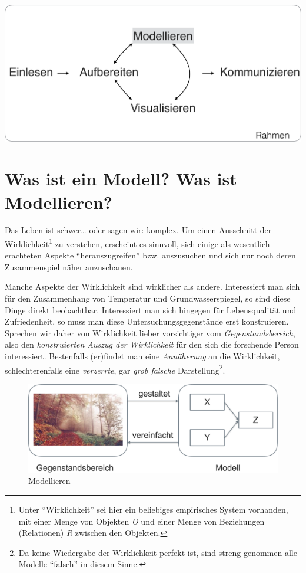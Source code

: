 \documentclass[12pt,]{book}
\let\rmarkdownfootnote\footnote%
\def\footnote{\protect\rmarkdownfootnote}
\begin{document}
\begin{center}\includegraphics[width=0.7\linewidth]{images/Modellieren} \end{center}

\section{Was ist ein Modell? Was ist Modellieren?}\label{Modellieren}

Das Leben ist schwer\ldots{} oder sagen wir: komplex. Um einen
Ausschnitt der Wirklichkeit\footnote{Unter ``Wirklichkeit'' sei hier ein
  beliebiges empirisches System vorhanden, mit einer Menge von Objekten
  \emph{O} und einer Menge von Beziehungen (Relationen) \emph{R}
  zwischen den Objekten.} zu verstehen, erscheint es sinnvoll, sich
einige als wesentlich erachteten Aspekte ``herauszugreifen'' bzw.
auszusuchen und sich nur noch deren Zusammenspiel näher anzuschauen.

Manche Aspekte der Wirklichkeit sind wirklicher als andere. Interessiert
man sich für den Zusammenhang von Temperatur und Grundwasserspiegel, so
sind diese Dinge direkt beobachtbar. Interessiert man sich hingegen für
Lebensqualität und Zufriedenheit, so muss man diese
Untersuchungsgegenstände erst konstruieren. Sprechen wir daher von
Wirklichkeit lieber vorsichtiger vom \emph{Gegenstandsbereich}, also den
\emph{konstruierten Auszug der Wirklichkeit} für den sich die forschende
Person interessiert. Bestenfalls (er)findet man eine \emph{Annäherung}
an die Wirklichkeit, schlechterenfalls eine \emph{verzerrte}, gar
\emph{grob falsche} Darstellung\footnote{Da keine Wiedergabe der
  Wirklichkeit perfekt ist, sind streng genommen alle Modelle ``falsch''
  in diesem Sinne.}.

\begin{figure}

{\centering \includegraphics[width=0.7\linewidth]{images/Modell} 

}

\caption{Modellieren}\label{fig:modellieren-plot}
\end{figure}
\end{document}
